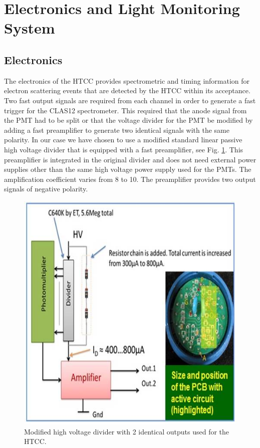 \section{Electronics and Light Monitoring System}
\subsection{Electronics}

\indent The electronics of the HTCC provides spectrometric and timing information for electron scattering events that are detected by the HTCC within its acceptance. Two fast output signals are required from each channel in order to generate a fast trigger for the CLAS12 spectrometer. This required that the anode signal from the PMT had to be split or that the voltage divider for the PMT be modified by adding a fast preamplifier to generate two identical signals with the same polarity. In our case we have chosen to use a modified standard linear passive high voltage divider that is equipped with a fast preamplifier, see Fig. \ref{fig:POPOV_1}. This preamplifier is integrated in the original divider and does not need external power supplies other than the same high voltage power supply used for the PMTs. The amplification coefficient varies from 8 to 10. The preamplifier provides two output signals of negative polarity. 

\begin{figure}[!ht]
    \centering
    \includegraphics[width=1.0\linewidth,trim={0.0cm 0.0cm 0.0cm 0.0cm},clip]{images/POPOV_1.jpg}
    \caption{Modified high voltage divider with 2 identical outputs used for the HTCC.}
    \label{fig:POPOV_1}
\end{figure}

